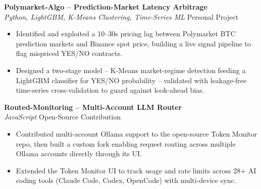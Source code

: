 \documentclass[letterpaper,11pt]{article}
\begin{document}
\vspace{1pt}
\textbf{Polymarket-Algo -- Prediction-Market Latency Arbitrage} \\
\hspace*{0.15in}\textit{Python, LightGBM, K-Means Clustering, Time-Series ML} \hfill Personal Project
\begin{itemize}[leftmargin=0.32in,labelsep=0.45em,itemsep=2pt,topsep=2pt,partopsep=0pt,parsep=0pt]
  \item Identified and exploited a 10--30s pricing lag between Polymarket BTC prediction markets
        and Binance spot price, building a live signal pipeline to flag mispriced YES/NO contracts.
  \item Designed a two-stage model -- K-Means market-regime detection feeding a LightGBM classifier
        for YES/NO probability -- validated with leakage-free time-series cross-validation to
        guard against look-ahead bias.
\end{itemize}

\vspace{1pt}
\textbf{Routed-Monitoring -- Multi-Account LLM Router} \\
\hspace*{0.15in}\textit{JavaScript} \hfill Open-Source Contribution
\begin{itemize}[leftmargin=0.32in,labelsep=0.45em,itemsep=2pt,topsep=2pt,partopsep=0pt,parsep=0pt]
  \item Contributed multi-account Ollama support to the open-source Token Monitor repo, then built
        a custom fork enabling request routing across multiple Ollama accounts directly through
        its UI.
  \item Extended the Token Monitor UI to track usage and rate limits across 28+ AI coding tools
        (Claude Code, Codex, OpenCode) with multi-device sync.
\end{itemize}
\end{document}
